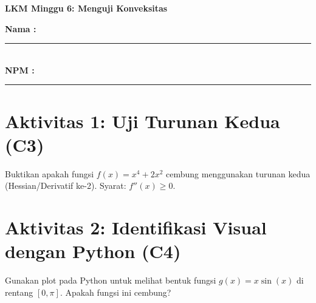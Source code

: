 \documentclass[11pt, a4paper]{article}
\begin{document}
\begin{center}\Large\color{UNIBBlue}\textbf{LKM Minggu 6: Menguji Konveksitas}\end{center}
\textbf{Nama :} \rule{6cm}{0.4pt} \\
\textbf{NPM :} \rule{6.8cm}{0.4pt}
\section*{Aktivitas 1: Uji Turunan Kedua (C3)}
Buktikan apakah fungsi $f(x) = x^4 + 2x^2$ cembung menggunakan turunan kedua (Hessian/Derivatif ke-2).
Syarat: $f''(x) \ge 0$.
\section*{Aktivitas 2: Identifikasi Visual dengan Python (C4)}
Gunakan plot pada Python untuk melihat bentuk fungsi $g(x) = x \sin(x)$ di rentang $[0, \pi]$. Apakah fungsi ini cembung?
\end{document}
